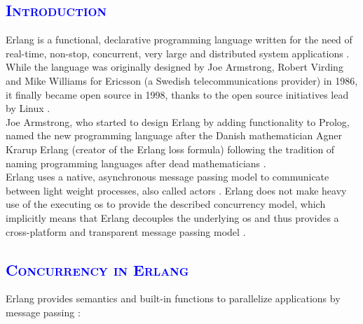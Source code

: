 \documentclass[xcolor=dvipsnames]{article}
\begin{document}
\subsection{\scshape{\textcolor{blue}{Introduction}}}

Erlang is a functional, declarative programming language written for the need of real-time, non-stop, concurrent, very large and distributed system applications \cite[chap. 1 / p. 1]{Armstrong96erlang}. While the language was originally designed by Joe Armstrong, Robert Virding and Mike Williams for Ericsson (a Swedish telecommunications provider) in 1986, it finally became open source in 1998, thanks to the open source initiatives lead by Linux \cite[chap. 8 on p. 39]{erl_history}.\\

\noindent Joe Armstrong, who started to design Erlang by adding functionality to Prolog, named the new programming language after the Danish mathematician \sloppy Agner \sloppy Krarup  Erlang (creator of the Erlang loss formula) following the tradition of naming programming languages after dead mathematicians \cite[chap. 4.1 on p. 13]{erl_history}.\\

\noindent Erlang uses a native, asynchronous message passing model to communicate between light weight processes, also called actors \cite[chap. 1 on p. 1]{Armstrong96erlang}. Erlang does not make heavy use of the executing \gls{os} to provide the described concurrency model, which implicitly means that Erlang decouples the underlying \gls{os} and thus provides a cross-platform and transparent message passing model \cite[chap. 1  \& 3 on p. 1 - 3]{Armstrong96erlang}.

\subsection{\scshape{\textcolor{blue}{Concurrency in Erlang}}}

\noindent Erlang provides semantics and built-in functions to parallelize  applications by message passing \cite[ch. 4.3 on p. 95 - 104]{erl_doc}:
\end{document}
